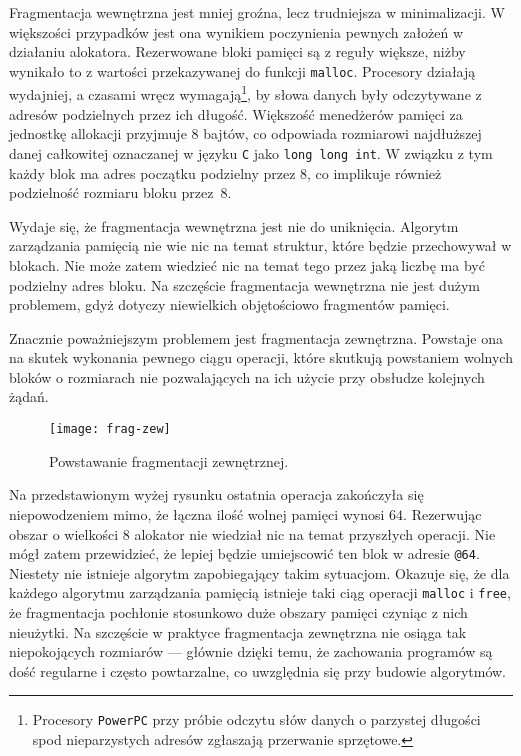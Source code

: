 \documentclass[12pt,a4paper,titlepage,twoside]{mwart}
\begin{document}
Fragmentacja wewnętrzna jest mniej groźna, lecz trudniejsza w minimalizacji. W
większości przypadków jest ona wynikiem poczynienia pewnych założeń w działaniu
alokatora. Rezerwowane bloki pamięci są z reguły większe, niżby wynikało to z
wartości przekazywanej do funkcji \texttt{malloc}. Procesory działają
wydajniej, a czasami wręcz wymagają\footnote{Procesory \texttt{PowerPC} przy
próbie odczytu słów danych o parzystej długości spod nieparzystych adresów
zgłaszają przerwanie sprzętowe.}, by słowa danych były odczytywane z adresów
podzielnych przez ich długość. Większość menedżerów pamięci za jednostkę
allokacji przyjmuje $8$ bajtów, co odpowiada rozmiarowi najdłuższej danej
całkowitej oznaczanej w języku \verb+C+ jako \verb+long long int+. W związku z
tym każdy blok ma adres początku podzielny przez $8$, co implikuje również 
podzielność rozmiaru bloku przez~$8$.

Wydaje się, że fragmentacja wewnętrzna jest nie do uniknięcia. Algorytm
zarządzania pamięcią nie wie nic na temat struktur, które będzie przechowywał w
blokach. Nie może zatem wiedzieć nic na temat tego przez jaką liczbę ma być
podzielny adres bloku. Na szczęście fragmentacja wewnętrzna nie jest dużym
problemem, gdyż dotyczy niewielkich objętościowo fragmentów pamięci.

Znacznie poważniejszym problemem jest fragmentacja zewnętrzna. Powstaje ona na
skutek wykonania pewnego ciągu operacji, które skutkują powstaniem wolnych
bloków o rozmiarach nie pozwalających na ich użycie przy obsłudze kolejnych
żądań.

\begin{figure}[h]
\centering
\texttt{[image: frag-zew]}
\caption{Powstawanie fragmentacji zewnętrznej.}
\end{figure}

Na przedstawionym wyżej rysunku ostatnia operacja zakończyła się niepowodzeniem
mimo, że łączna ilość wolnej pamięci wynosi $64$. Rezerwując obszar o wielkości
$8$ alokator nie wiedział nic na temat przyszłych operacji. Nie mógł zatem
przewidzieć, że lepiej będzie umiejscowić ten blok w adresie \verb+@64+.
Niestety nie istnieje algorytm zapobiegający takim sytuacjom. Okazuje się, że
dla każdego algorytmu zarządzania pamięcią istnieje taki ciąg operacji
\texttt{malloc} i \texttt{free}, że fragmentacja pochłonie stosunkowo duże
obszary pamięci czyniąc z nich nieużytki. Na szczęście w praktyce fragmentacja
zewnętrzna nie osiąga tak niepokojących rozmiarów --- głównie dzięki temu, że
zachowania programów są dość regularne i często powtarzalne, co uwzględnia się
przy budowie algorytmów.
\end{document}
